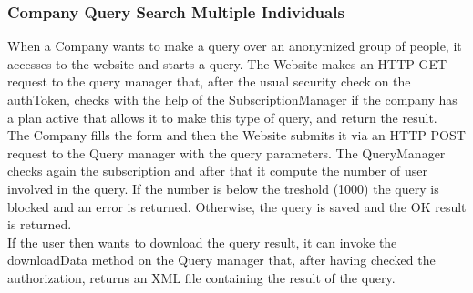 \subsubsection{Company Query Search Multiple Individuals}
When a Company wants to make a query over an anonymized group of people, it accesses to the website and starts a query. The Website makes an HTTP GET request to the query manager that, after the usual security check on the authToken, checks with the help of the SubscriptionManager if the company has a plan active that allows it to make this type of query, and return the result.\\
The Company fills the form and then the Website submits it via an HTTP POST request to the Query manager with the query parameters. The QueryManager checks again the subscription and after that it compute the number of user involved in the query. If the number is below the treshold (1000) the query is blocked and an error is returned. Otherwise, the query is saved and the OK result is returned.\\
If the user then wants to download the query result, it can invoke the downloadData method on the Query manager that, after having checked the authorization, returns an XML file containing the result of the query.


